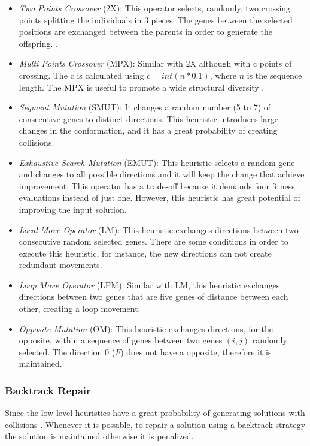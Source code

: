 \documentclass[conference]{IEEEtran}
\begin{document}
  \begin{itemize}
  	\item \textit{Two Points Crossover} (2X): This operator selects, randomly, two crossing points splitting the individuals in 3 pieces. The genes between the selected positions are exchanged between the parents in order to generate the offspring. \cite{benitez2015algoritmo}.
  	
  	
  	\item  \textit{Multi Points Crossover} (MPX): Similar with 2X although with c points of crossing. The c is calculated using  $c = int(n * 0.1)$, where $n$ is the sequence length. The MPX is useful to promote a wide structural diversity \cite{sabar2015automatic}.
  	
	\item \textit{Segment Mutation} (SMUT): It changes a random number (5 to 7) of consecutive genes to distinct directions. This heuristic introduces large changes in the conformation, and it has a great probability of creating collisions.  

	\item \textit {Exhaustive Search Mutation} (EMUT): This heuristic selects a random gene and changes to all possible directions and it will keep the change that achieve improvement. This operator has a trade-off because it demands four fitness evaluations instead of just one. However, this heuristic has great potential of improving the input solution.
	
	\item \textit{Local Move Operator} (LM): This heuristic exchanges directions between two consecutive random selected genes. There are some conditions in order to execute this heuristic, for instance, the new directions can not create redundant movements. 
	
	\item \textit{Loop Move Operator} (LPM): Similar with LM, this heuristic exchanges directions between two genes that are five genes of distance between each other, creating a loop movement.
	
	
	\item \textit{Opposite Mutation} (OM): This heuristic exchanges directions, for the opposite, within a sequence of genes between two genes $(i,j)$ randomly selected. The direction 0 ($F$) does not have a opposite, therefore it is maintained. 
	
 \end{itemize} 	 
 
 \subsubsection{Backtrack Repair}
 Since the low level heuristics have a great probability of generating solutions with collisions \cite{benitez2015algoritmo}. Whenever it is possible, to repair a solution using a backtrack strategy the solution is maintained otherwise it is penalized. 
 
\end{document}
